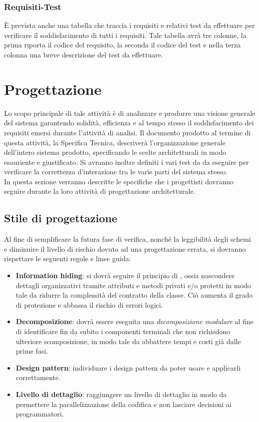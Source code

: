 {\subsubsection{Requisiti-Test}
È prevista anche una tabella che traccia i requisiti e relativi test da effettuare per verificare il soddisfacimento di tutti i requisiti. Tale tabella avrà tre colonne, la prima riporta il codice del requisito, la seconda il codice del test e nella terza colonna una breve descrizione del test da effettuare.
\clearpage

\section{Progettazione}\label{sec:progettazione}
Lo scopo principale di tale attività è di analizzare e produrre una visione generale del sistema garantendo solidità, efficienza e al tempo stesso il soddisfacimento dei requisiti emersi durante l'attività di analisi.
Il documento prodotto al termine di questa attività, la Specifica Tecnica, descriverà l'organizzazione generale dell'intero sistema prodotto, specificando le scelte architetturali in modo esauriente e giustificato. Si avranno inoltre definiti i vari test da da eseguire per verificare la correttezza d'interazione tra le varie parti del sistema stesso.\\

In questa sezione verranno descritte le specifiche che i progettisti dovranno seguire durante la loro attività di progettazione architetturale.

\subsection{Stile di progettazione}
Al fine di semplificare la futura fase di verifica, nonché la leggibilità degli schemi e diminuire il livello di rischio dovuto ad una progettazione errata, si dovranno rispettare le seguenti regole e linee guida:
\begin{itemize}
\item \textbf{Information hiding}: si dovrà seguire il principio di , ossia nascondere dettagli organizzativi tramite attributi e metodi privati e/o protetti in modo tale da ridurre la complessità del contratto della classe. Ciò aumenta il grado di protezione e abbassa il rischio di errori logici.
\item \textbf{Decomposizione}: dovrà essere eseguita una \textit{decomposizione modulare} al fine di identificare fin da subito i componenti terminali che non richiedono ulteriore scomposizione, in modo tale da abbattere tempi e costi già dalle prime fasi.
\item \textbf{Design pattern}: individuare i design pattern da poter usare e applicarli correttamente.
\item \textbf{Livello di dettaglio}: raggiungere un livello di dettaglio in modo da permettere la parallelizzazione della codifica e non lasciare decisioni ai programmatori. 


\end{itemize}}
